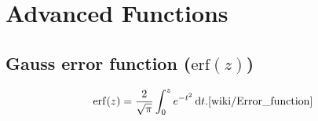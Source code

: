 \chapter{Advanced Functions}


\section{Gauss error function ($\text{erf}(z)$)}

\[
    {\displaystyle \operatorname {erf} (z)={\frac {2}{\sqrt {\pi }}}\int _{0}^{z}e^{-t^{2}}\,\mathrm {d} t.}
    \hfill \text{\cite{wiki/Error_function}}
\]







